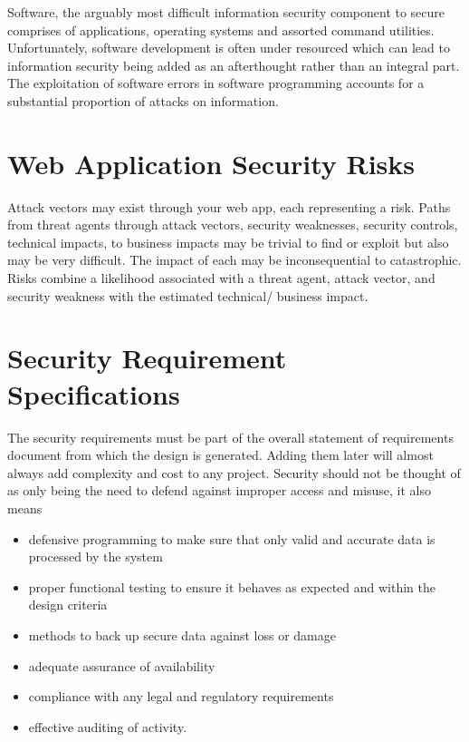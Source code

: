 
Software, the arguably most difficult information security component to secure comprises of applications, operating systems and assorted command utilities. Unfortunately, software development is often under resourced which can lead to information security being added as an afterthought rather than an integral part. The exploitation of software errors in software programming accounts for a substantial proportion of attacks on information.

\section*{Web Application Security Risks}
Attack vectors may exist through your web app, each representing a risk. Paths from threat agents through attack vectors, security weaknesses, security controls, technical impacts, to business impacts may be trivial to find or exploit but also may be very difficult. The impact of each may be inconsequential to catastrophic. Risks combine a likelihood associated with a threat agent, attack vector, and security weakness with the estimated technical/ business impact. 

\section*{Security Requirement Specifications}
The security requirements must be part of the overall statement of requirements document from which the design is generated. Adding them later will almost always add complexity and cost to any project. Security should not be thought of as only being the need to defend against improper access and misuse, it also means
\begin{itemize}
    \item defensive programming to make sure that only valid and accurate data is processed by the system
    \item proper functional testing to ensure it behaves as expected and within the design criteria
    \item methods to back up secure data against loss or damage
    \item adequate assurance of availability
    \item compliance with any legal and regulatory requirements
    \item effective auditing of activity.
\end{itemize}

